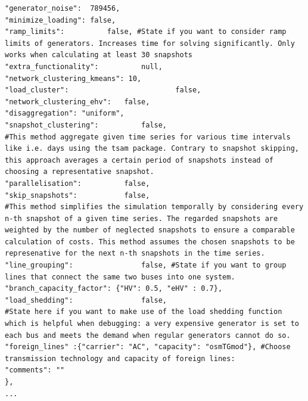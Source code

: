 \documentclass[
a4paper,     %
12pt         %
]{scrartcl}  %
\begin{document}
\begin{lstlisting}
"generator_noise": 	789456,
"minimize_loading": false,
"ramp_limits": 			false, #State if you want to consider ramp limits of generators. Increases time for solving significantly. Only works when calculating at least 30 snapshots
"extra_functionality": 			null,
"network_clustering_kmeans": 10,
"load_cluster": 						false,
"network_clustering_ehv": 	false,
"disaggregation": "uniform",
"snapshot_clustering": 			false,
#This method aggregate given time series for various time intervals like i.e. days using the tsam package. Contrary to snapshot skipping, this approach averages a certain period of snapshots instead of choosing a representative snapshot.
"parallelisation": 			false,
"skip_snapshots": 			false,
#This method simplifies the simulation temporally by considering every n-th snapshot of a given time series. The regarded snapshots are weighted by the number of neglected snapshots to ensure a comparable calculation of costs. This method assumes the chosen snapshots to be represenative for the next n-th snapshots in the time series.
"line_grouping": 				false, #State if you want to group lines that connect the same two buses into one system.
"branch_capacity_factor": {"HV": 0.5, "eHV" : 0.7},
"load_shedding": 				false,
#State here if you want to make use of the load shedding function which is helpful when debugging: a very expensive generator is set to each bus and meets the demand when regular generators cannot do so.
"foreign_lines" :{"carrier": "AC", "capacity": "osmTGmod"}, #Choose transmission technology and capacity of foreign lines:
"comments": ""
},
...
\end{lstlisting}
\end{document}
